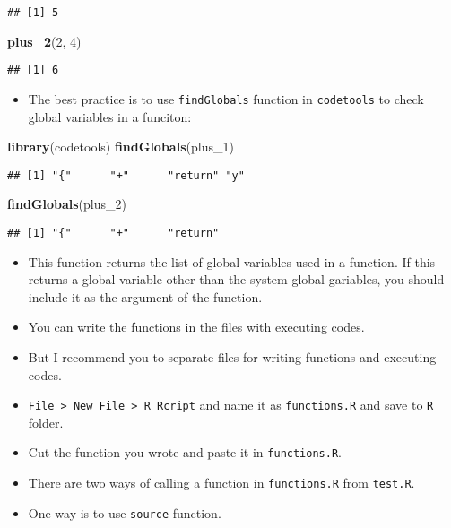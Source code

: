 \documentclass[
]{book}
\newenvironment{Shaded}{\begin{snugshade}}{\end{snugshade}}
\newcommand{\DecValTok}[1]{\textcolor[rgb]{0.00,0.00,0.81}{#1}}
\newcommand{\KeywordTok}[1]{\textcolor[rgb]{0.13,0.29,0.53}{\textbf{#1}}}
\newcommand{\NormalTok}[1]{#1}
\providecommand{\tightlist}{%
  \setlength{\itemsep}{0pt}\setlength{\parskip}{0pt}}
\begin{document}
\begin{verbatim}
## [1] 5
\end{verbatim}

\begin{Shaded}
\begin{Highlighting}[]
\KeywordTok{plus_2}\NormalTok{(}\DecValTok{2}\NormalTok{, }\DecValTok{4}\NormalTok{)}
\end{Highlighting}
\end{Shaded}

\begin{verbatim}
## [1] 6
\end{verbatim}

\begin{itemize}
\tightlist
\item
  The best practice is to use \texttt{findGlobals} function in \texttt{codetools} to check global variables in a funciton:
\end{itemize}

\begin{Shaded}
\begin{Highlighting}[]
\KeywordTok{library}\NormalTok{(codetools)}
\KeywordTok{findGlobals}\NormalTok{(plus_}\DecValTok{1}\NormalTok{)}
\end{Highlighting}
\end{Shaded}

\begin{verbatim}
## [1] "{"      "+"      "return" "y"
\end{verbatim}

\begin{Shaded}
\begin{Highlighting}[]
\KeywordTok{findGlobals}\NormalTok{(plus_}\DecValTok{2}\NormalTok{)}
\end{Highlighting}
\end{Shaded}

\begin{verbatim}
## [1] "{"      "+"      "return"
\end{verbatim}

\begin{itemize}
\item
  This function returns the list of global variables used in a function. If this returns a global variable other than the system global gariables, you should include it as the argument of the function.
\item
  You can write the functions in the files with executing codes.
\item
  But I recommend you to separate files for writing functions and executing codes.
\item
  \texttt{File\ \textgreater{}\ New\ File\ \textgreater{}\ R\ Rcript} and name it as \texttt{functions.R} and save to \texttt{R} folder.
\item
  Cut the function you wrote and paste it in \texttt{functions.R}.
\item
  There are two ways of calling a function in \texttt{functions.R} from \texttt{test.R}.
\item
  One way is to use \texttt{source} function.
\end{itemize}
\end{document}
